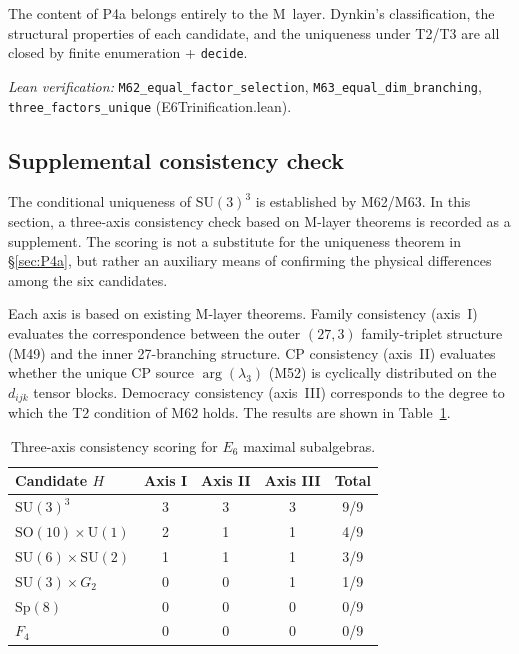 \documentclass[sn-mathphys-num,Numbered]{sn-jnl}
\theoremstyle{thmstyleone}
\theoremstyle{thmstylethree}
\newcommand{\SU}{\mathrm{SU}}
\newcommand{\SO}{\mathrm{SO}}
\newcommand{\Sp}{\mathrm{Sp}}
\newcommand{\U}{\mathrm{U}}
\begin{document}
The content of P4a belongs entirely to the M~layer.  Dynkin's classification,
the structural properties of each candidate, and the uniqueness under T2/T3
are all closed by finite enumeration + \texttt{decide}.

\noindent\textit{Lean verification:}
\texttt{M62\_equal\_factor\_selection},
\texttt{M63\_equal\_dim\_branching},
\texttt{three\_factors\_unique} (E6Trinification.lean).


\subsection{Supplemental consistency check}\label{sec:consistency}

The conditional uniqueness of $\SU(3)^3$ is established by M62/M63.  In this
section, a three-axis consistency check based on M-layer theorems is recorded
as a supplement.  The scoring is not a substitute for the uniqueness theorem in
\S\ref{sec:P4a}, but rather an auxiliary means of confirming the physical
differences among the six candidates.

Each axis is based on existing M-layer theorems.  Family consistency (axis~I)
evaluates the correspondence between the outer $(27,3)$ family-triplet
structure (M49) and the inner 27-branching structure.  CP consistency (axis~II)
evaluates whether the unique CP source $\arg(\lambda_3)$ (M52) is cyclically
distributed on the $d_{ijk}$ tensor blocks.  Democracy consistency (axis~III)
corresponds to the degree to which the T2 condition of M62 holds.  The results
are shown in Table~\ref{tab:scoring}.

\begin{table}[htb]
\centering
\caption{Three-axis consistency scoring for $E_6$ maximal
  subalgebras.}\label{tab:scoring}
\begin{tabular}{lcccc}
\toprule
Candidate $H$ & Axis I & Axis II & Axis III & Total \\
\midrule
$\SU(3)^3$ & 3 & 3 & 3 & 9/9 \\
$\SO(10) \times \U(1)$ & 2 & 1 & 1 & 4/9 \\
$\SU(6) \times \SU(2)$ & 1 & 1 & 1 & 3/9 \\
$\SU(3) \times G_2$ & 0 & 0 & 1 & 1/9 \\
$\Sp(8)$ & 0 & 0 & 0 & 0/9 \\
$F_4$ & 0 & 0 & 0 & 0/9 \\
\bottomrule
\end{tabular}
\end{table}
\end{document}

